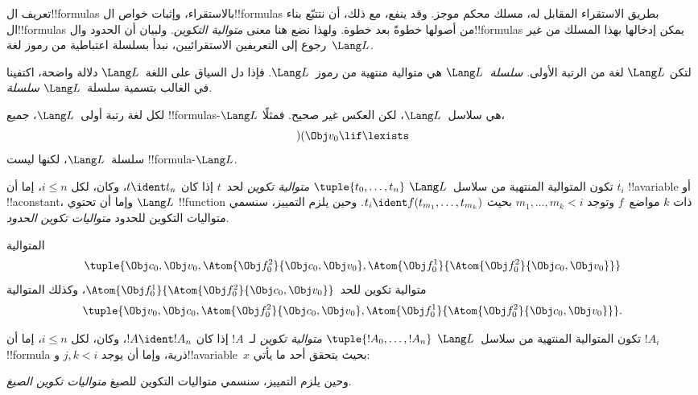 \documentclass[../../../include/open-logic-section]{subfiles}
\begin{document}


تعريف ال!!{formula}s بالاستقراء، وإثبات خواص ال!!{formula}s
بطريق الاستقراء المقابل له، مسلك محكم موجز. وقد ينفع، مع ذلك،
أن نتتبّع بناء ال!!{formula}s من أصولها خطوةً بعد خطوة.
ولهذا نضع هنا معنى \emph{متوالية التكوين}.
%
ولبيان أن الحدود وال!!{formula}s يمكن إدخالها بهذا المسلك من غير
رجوع إلى التعريفين الاستقرائيين، نبدأ بسلسلة اعتباطية من رموز
لغة~$\Lang L$.

\begin{defn}[السلاسل]
لتكن $\Lang L$ لغة من الرتبة الأولى. \emph{سلسلة~$\Lang L$} هي
متوالية منتهية من رموز~$\Lang L$. فإذا دل السياق على اللغة~$\Lang L$ دلالة واضحة، اكتفينا في الغالب
بتسمية سلسلة~$\Lang L$ \emph{سلسلة}.
\end{defn}

\begin{ex}
لكل لغة رتبة أولى~$\Lang L$، جميع
!!{formula}s-$\Lang L$ هي سلاسل~$\Lang L$، لكن العكس غير صحيح.
فمثلًا، \[)(\Obj v_0\lif\lexists\] سلسلة~$\Lang L$، لكنها ليست
!!{formula}-$\Lang L$.
\end{ex}

\begin{defn}
تكون المتوالية المنتهية من سلاسل~$\Lang L$
$\tuple{t_0,\dotsc,t_n}$ \emph{متوالية تكوين} لحد~$t$ إذا كان
$t \ident t_n$، وكان، لكل $i \leq n$، إما أن $t_i$ !!a{variable}
أو !!a{constant}، وإما أن تحتوي $\Lang L$ !!{function} ذات
$k$ مواضع~$f$ وتوجد $m_1,\dotsc,m_k < i$ بحيث
$t_i \ident f(t_{m_1},\dotsc,t_{m_k})$. وحين يلزم التمييز، سنسمي
متواليات التكوين للحدود \emph{متواليات تكوين الحدود}.
\end{defn}

\begin{ex}
المتوالية
\[
    \tuple{\Obj c_0, \Obj v_0, \Atom{\Obj f^2_0}{\Obj c_0, \Obj v_0}, \Atom{\Obj f^1_0}{\Atom{\Obj f^2_0}{\Obj c_0, \Obj v_0}}}
\]
متوالية تكوين للحد~$\Atom{\Obj f^1_0}{\Atom{\Obj
f^2_0}{\Obj c_0, \Obj v_0}}$، وكذلك المتوالية
\[
    \tuple{\Obj v_0, \Obj c_0, \Atom{\Obj f^2_0}{\Obj c_0, \Obj v_0}, \Atom{\Obj f^1_0}{\Atom{\Obj f^2_0}{\Obj c_0, \Obj v_0}}}.
\]
\end{ex}

\begin{defn}
تكون المتوالية المنتهية من سلاسل~$\Lang L$
$\tuple{!A_0,\dotsc,!A_n}$ \emph{متوالية تكوين} لـ~$!A$ إذا كان
$!A \ident !A_n$، وكان، لكل $i \leq n$، إما أن $!A_i$
!!{formula} ذرية، وإما أن يوجد $j,k < i$ و!!a{variable}~$x$ بحيث
يتحقق أحد ما يأتي:
\begin{enumerate}
\end{enumerate}
وحين يلزم التمييز، سنسمي متواليات التكوين للصيغ
\emph{متواليات تكوين الصيغ}.
\end{defn}
\end{document}
